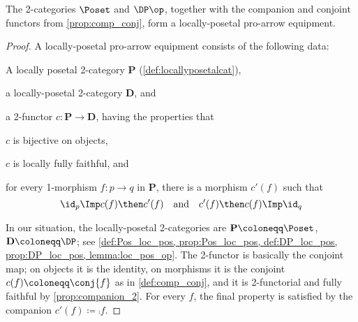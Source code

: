 \begin{theorem}
The 2-categories $\Poset$ and $\DP\op$, together with the companion and conjoint functors from \cref{prop:comp_conj}, form a locally-posetal pro-arrow equipment.
\end{theorem}
\begin{proof}
A locally-posetal pro-arrow equipment consists of the following data:
\begin{compactitem}
	\item A locally posetal 2-category $\mathbf{P}$ (\cref{def:locallyposetalcat}),
	\item a locally-posetal 2-category $\mathbf{D}$, and
	\item a 2-functor $c\colon\mathbf{P}\to\mathbf{D}$, having the properties that
	\begin{compactitem}
		\item $c$ is bijective on objects,
		\item $c$ is locally fully faithful, and
		\item for every 1-morphism $f\colon p\to q$ in $\mathbf{P}$, there is a morphism $c'(f)$ such that
		\begin{equation}
		\id_p\Imp c(f)\then c'(f)\quad\text{and}\quad c'(f)\then c(f)\Imp\id_q
		\end{equation}
	\end{compactitem}
\end{compactitem}
In our situation, the locally-posetal 2-categories are $\mathbf{P}\coloneqq\Poset$, $\mathbf{D}\coloneqq\DP$; see \cref{def:Pos_loc_pos, prop:Pos_loc_pos, def:DP_loc_pos, prop:DP_loc_pos, lemma:loc_pos_op}. The 2-functor is basically the conjoint map; on objects it is the identity, on morphisms it is the conjoint $c(f)\coloneqq\conj{f}$ as in \cref{def:comp_conj}, and it is 2-functorial and fully faithful by \cref{prop:companion_2}. For every $f$, the final property is satisfied by the companion $c'(f)\coloneqq \comp{f}$.
\end{proof}



